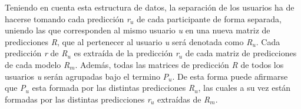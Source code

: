 Teniendo en cuenta esta estructura de datos, la separación de los usuarios ha de hacerse tomando cada predicción \textit{r$_{u}$} de cada participante de forma separada, uniendo las que corresponden al mismo usuario \textit{u} en una nueva matriz de predicciones \textit{R}, que al pertenecer al usuario \textit{u} será denotada como \textit{R$_{u}$}. Cada predicción \textit{r} de \textit{R$_{u}$} es extraída de la predicción \textit{r$_{u}$} de cada matriz de predicciones de cada modelo \textit{R$_{m}$}. Además, todas las matrices de predicción \textit{R} de todos los usuarios \textit{u} serán agrupadas bajo el termino \textit{P$_{u}$}. De esta forma puede afirmarse que \textit{P$_{u}$} esta formada por las distintas predicciones \textit{R$_{u}$}, las cuales a su vez están formadas por las distintas predicciones \textit{r$_{u}$} extraídas de \textit{R$_{m}$}.
